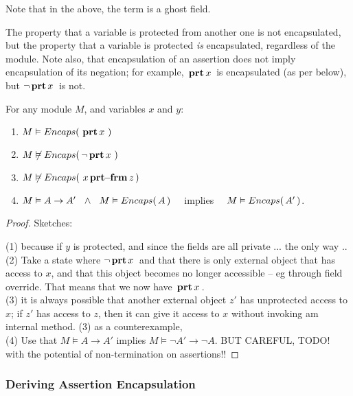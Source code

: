 \noindent
{Note that in the above, the term  is a ghost field.}



The property that a variable is protected from another one is not encapsulated, but  the property that a variable is protected \emph{is} encapsulated, regardless of the module. Note also, that  encapsulation of an assertion does not imply encapsulation of its negation; 
 for example,  ${{\, \mathbf{prt}\, x\, }}$ is encapsulated (as per below), but $\neg  {{\ensuremath{\, \mathbf{prt}}\, x\, }}$ is not.


\begin{lemma}
For any module $M$, and variables $x$ and $y$:
\begin{enumerate} 
\item $M \vDash {\ensuremath Encaps(\, {\ensuremath{\, \mathbf{prt}}\, x\, }\, )}$
\item $M \not\vDash {{\ensuremath Encaps(\, \neg{\ensuremath{\, \mathbf{prt}}\, x\, }\, )}}$
\item $M \not\vDash {{\ensuremath Encaps(\, {\ensuremath{\, x\, \mathbf{prt\!\!-\!\!frm}}\, z}\, )}}$
\item $M \vDash A \rightarrow A' \ \ \wedge\ \  M \vDash  \encaps{A}$ \ \ implies \ \ $M \vDash  {\ensuremath Encaps(\, A'\, )}$.
\end{enumerate}
\end{lemma}

\begin{proof} Sketches:

(1) because if $y$ is protected, and since the fields are all private ... the only way .. 
\\
(2) Take a state where $\neg{\ensuremath{\, \mathbf{prt}}\, x\, }$ and that there is only external object that has access to $x$, and that this object becomes no longer accessible -- eg through field override. That means that we now have  ${\, \mathbf{prt}\, x\, }$.
\\
(3) it is always possible that another external object $z'$ has unprotected access to $x$; if $z'$ has access to $z$, then it can give it access to $x$ without invoking am internal method. (3) as a counterexample, 
\\
(4) Use that $M \vDash A \rightarrow A'$ implies $M \vDash \neg A'  \rightarrow \neg  A$. BUT CAREFUL, TODO! with the potential of non-termination on assertions!!
\end{proof}

\subsubsection{Deriving  Assertion Encapsulation}

